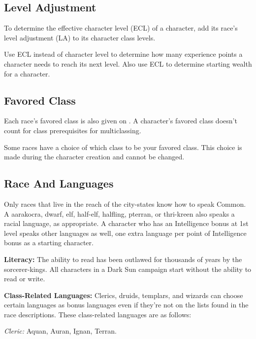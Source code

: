 \subsection{Level Adjustment}
To determine the effective character level (ECL) of a character, add its race's level adjustment (LA) to its character class levels.

Use ECL instead of character level to determine how many experience points a character needs to reach its next level. Also use ECL to determine starting wealth for a character.

\subsection{Favored Class}
Each race's favored class is also given on . A character's favored class doesn't count for class prerequisites for multiclassing. %


Some races have a choice of which class to be your favored class. This choice is made during the character creation and cannot be changed.

\subsection{Race And Languages}
Only races that live in the reach of the city-states know how to speak Common. A aarakocra, dwarf, elf, half-elf, halfling, pterran, or thri-kreen also speaks a racial language, as appropriate. A character who has an Intelligence bonus at 1st level speaks other languages as well, one extra language per point of Intelligence bonus as a starting character.

\textbf{Literacy:} The ability to read has been outlawed for thousands of years by the sorcerer-kings. All characters in a {\tableheader Dark Sun} campaign start without the ability to read or write.

\textbf{Class-Related Languages:} Clerics, druids, templars, and wizards can choose certain languages as bonus languages even if they're not on the lists found in the race descriptions. These class-related languages are as follows:

\textit{Cleric:} Aquan, Auran, Ignan, Terran.

